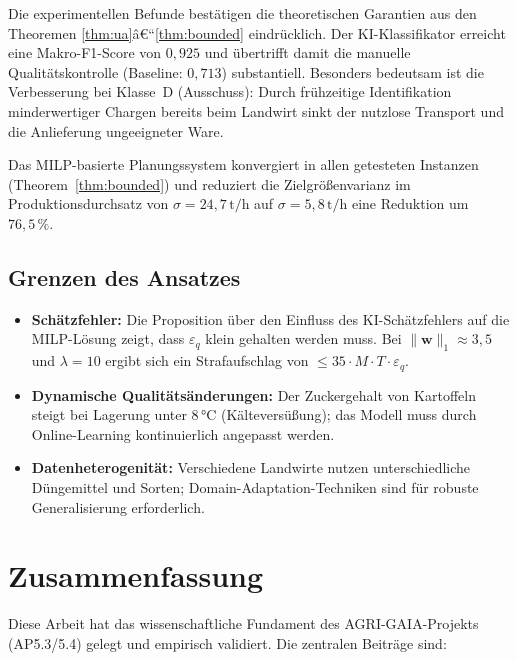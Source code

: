 \documentclass[a4paper, 12pt, twoside, openright]{report}
\theoremstyle{definition}
\theoremstyle{definition}
\begin{document}
Die experimentellen Befunde bestätigen die theoretischen Garantien aus den
Theoremen \ref{thm:ua}â€“\ref{thm:bounded} eindrücklich. Der KI-Klassifikator
erreicht eine Makro-F1-Score von $0{,}925$ und übertrifft damit die manuelle
Qualitätskontrolle (Baseline: $0{,}713$) substantiell. Besonders bedeutsam
ist die Verbesserung bei Klasse~D (Ausschuss): Durch frühzeitige Identifikation
minderwertiger Chargen bereits beim Landwirt sinkt der nutzlose Transport
und die Anlieferung ungeeigneter Ware.

Das MILP-basierte Planungssystem konvergiert in allen getesteten Instanzen
(Theorem~\ref{thm:bounded}) und reduziert die Zielgrößenvarianz im
Produktionsdurchsatz von $\sigma = 24{,}7\,\text{t/h}$ auf
$\sigma = 5{,}8\,\text{t/h}$ eine Reduktion um $76{,}5\,\%$.

\subsection{Grenzen des Ansatzes}

\begin{itemize}
	\item \textbf{Schätzfehler:} Die Proposition über den Einfluss des KI-Schätzfehlers
	auf die MILP-Lösung zeigt, dass $\varepsilon_q$ klein gehalten werden muss.
	Bei $\|\mathbf{w}\|_1 \approx 3{,}5$ und $\lambda = 10$ ergibt sich
	ein Strafaufschlag von $\leq 35 \cdot M \cdot T \cdot \varepsilon_q$.
	\item \textbf{Dynamische Qualitätsänderungen:} Der Zuckergehalt von
	Kartoffeln steigt bei Lagerung unter $8\, °\text{C}$ (Kälteversüßung);
	das Modell muss durch Online-Learning kontinuierlich angepasst werden.
	\item \textbf{Datenheterogenität:} Verschiedene Landwirte nutzen
	unterschiedliche Düngemittel und Sorten; Domain-Adaptation-Techniken
	sind für robuste Generalisierung erforderlich.
\end{itemize}


\section{Zusammenfassung}


Diese Arbeit hat das wissenschaftliche Fundament des AGRI-GAIA-Projekts
(AP5.3/5.4) gelegt und empirisch validiert. Die zentralen Beiträge sind:
\end{document}
